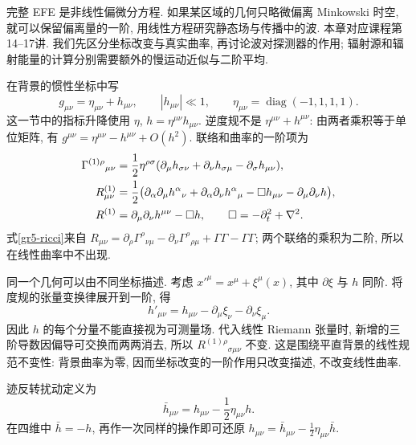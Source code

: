 \label{gr-ch-waves}

完整 EFE 是非线性偏微分方程. 如果某区域的几何只略微偏离 Minkowski 时空, 就可以保留偏离量的一阶, 用线性方程研究静态场与传播中的波. 本章对应课程第14--17讲. 我们先区分坐标改变与真实曲率, 再讨论波对探测器的作用; 辐射源和辐射能量的计算分别需要额外的慢运动近似与二阶平均.


在背景的惯性坐标中写
\[
 g_{\mu\nu}=\eta_{\mu\nu}+h_{\mu\nu},\qquad |h_{\mu\nu}|\ll1,
 \qquad \eta_{\mu\nu}=\operatorname{diag}(-1,1,1,1).
\]
这一节中的指标升降使用 $\eta$, $h=\eta^{\mu\nu}h_{\mu\nu}$. 逆度规不是 $\eta^{\mu\nu}+h^{\mu\nu}$: 由两者乘积等于单位矩阵, 有 $g^{\mu\nu}=\eta^{\mu\nu}-h^{\mu\nu}+O(h^2)$. 联络和曲率的一阶项为
\begin{align}
 \Gamma^{(1)\rho}{}_{\mu\nu}
 &=\frac12\eta^{\rho\sigma}
 (\partial_\mu h_{\sigma\nu}+\partial_\nu h_{\sigma\mu}-\partial_\sigma h_{\mu\nu}),\label{gr5-connection}\\
 R^{(1)}_{\mu\nu}
 &=\frac12\bigl(\partial_\alpha\partial_\mu h^\alpha{}_{\nu}
 +\partial_\alpha\partial_\nu h^\alpha{}_{\mu}
 -\Box h_{\mu\nu}-\partial_\mu\partial_\nu h\bigr),\label{gr5-ricci}\\
 R^{(1)}&=\partial_\mu\partial_\nu h^{\mu\nu}-\Box h,
 \qquad \Box=-\partial_t^2+\nabla^2.\notag
\end{align}
式\eqref{gr5-ricci}来自 $R_{\mu\nu}=\partial_\rho\Gamma^\rho{}_{\nu\mu}-\partial_\nu\Gamma^\rho{}_{\rho\mu}+\Gamma\Gamma-\Gamma\Gamma$; 两个联络的乘积为二阶, 所以在线性曲率中不出现.

同一个几何可以由不同坐标描述. 考虑 $x'^\mu=x^\mu+\xi^\mu(x)$, 其中 $\partial\xi$ 与 $h$ 同阶. 将度规的张量变换律展开到一阶, 得
\begin{equation}\label{gr5-gauge}
 h'_{\mu\nu}=h_{\mu\nu}-\partial_\mu\xi_\nu-\partial_\nu\xi_\mu.
\end{equation}
因此 $h$ 的每个分量不能直接视为可测量场. 代入线性 Riemann 张量时, 新增的三阶导数因偏导可交换而两两消去, 所以 $R^{(1)\rho}{}_{\sigma\mu\nu}$ 不变. 这是围绕平直背景的线性规范不变性: 背景曲率为零, 因而坐标改变的一阶作用只改变描述, 不改变线性曲率.

\begin{definition}
迹反转扰动定义为
\[
 \bar h_{\mu\nu}=h_{\mu\nu}-\frac12\eta_{\mu\nu}h.
\]
在四维中 $\bar h=-h$, 再作一次同样的操作即可还原 $h_{\mu\nu}=\bar h_{\mu\nu}-\tfrac12\eta_{\mu\nu}\bar h$.
\end{definition}

